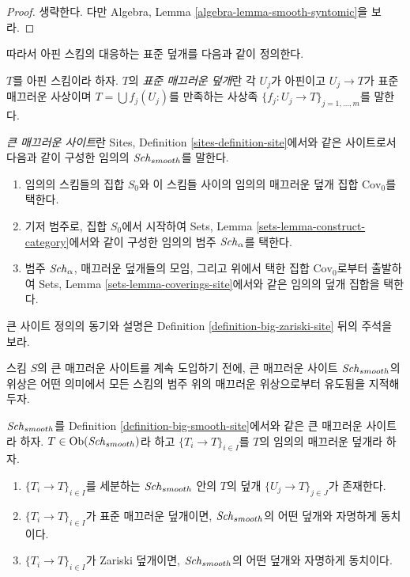 \begin{proof}
생략한다. 다만 Algebra, Lemma \ref{algebra-lemma-smooth-syntomic}을 보라.
\end{proof}

\noindent
따라서 아핀 스킴의 대응하는 표준 덮개를 다음과 같이 정의한다.

\begin{definition}
\label{definition-standard-smooth}
$T$를 아핀 스킴이라 하자. $T$의 {\it 표준 매끄러운 덮개}란 각 $U_j$가
아핀이고 $U_j \to T$가 표준 매끄러운 사상이며
$T = \bigcup f_j(U_j)$를 만족하는 사상족
$\{f_j : U_j \to T\}_{j = 1, \ldots, m}$를 말한다.
\end{definition}

\begin{definition}
\label{definition-big-smooth-site}
{\it 큰 매끄러운 사이트}란 Sites, Definition
\ref{sites-definition-site}에서와 같은 사이트로서 다음과 같이 구성한
임의의 $\mathit{Sch}_{smooth}$를 말한다.
\begin{enumerate}
\item 임의의 스킴들의 집합 $S_0$와 이 스킴들 사이의 임의의 매끄러운
덮개 집합 $\text{Cov}_0$를 택한다.
\item 기저 범주로, 집합 $S_0$에서 시작하여 Sets, Lemma
\ref{sets-lemma-construct-category}에서와 같이 구성한 임의의 범주
$\mathit{Sch}_\alpha$를 택한다.
\item 범주 $\mathit{Sch}_\alpha$, 매끄러운 덮개들의 모임, 그리고 위에서 택한
집합 $\text{Cov}_0$로부터 출발하여 Sets, Lemma
\ref{sets-lemma-coverings-site}에서와 같은 임의의 덮개 집합을 택한다.
\end{enumerate}
\end{definition}

\noindent
큰 사이트 정의의 동기와 설명은 Definition
\ref{definition-big-zariski-site} 뒤의 주석을 보라.

\medskip\noindent
스킴 $S$의 큰 매끄러운 사이트를 계속 도입하기 전에, 큰 매끄러운
사이트 $\mathit{Sch}_{smooth}$의 위상은 어떤 의미에서 모든 스킴의 범주 위의
매끄러운 위상으로부터 유도됨을 지적해 두자.

\begin{lemma}
\label{lemma-smooth-induced}
$\mathit{Sch}_{smooth}$를 Definition \ref{definition-big-smooth-site}에서와 같은
큰 매끄러운 사이트라 하자. $T \in \mathop{\mathrm{Ob}}\nolimits(\mathit{Sch}_{smooth})$라 하고
$\{T_i \to T\}_{i \in I}$를 $T$의 임의의 매끄러운 덮개라 하자.
\begin{enumerate}
\item $\{T_i \to T\}_{i \in I}$를 세분하는 $\mathit{Sch}_{smooth}$ 안의 $T$의
덮개 $\{U_j \to T\}_{j \in J}$가 존재한다.
\item $\{T_i \to T\}_{i \in I}$가 표준 매끄러운 덮개이면,
$\mathit{Sch}_{smooth}$의 어떤 덮개와 자명하게 동치이다.
\item $\{T_i \to T\}_{i \in I}$가 Zariski 덮개이면,
$\mathit{Sch}_{smooth}$의 어떤 덮개와 자명하게 동치이다.
\end{enumerate}
\end{lemma}

